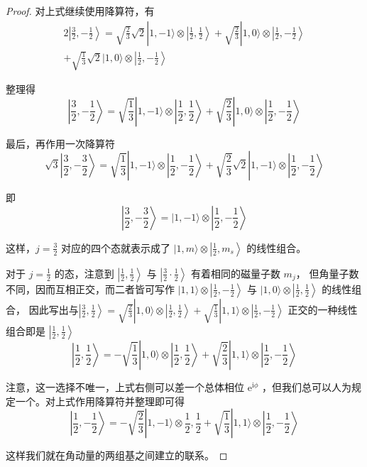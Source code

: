 \begin{proof}
对上式继续使用降算符，有
$$
\begin{gathered}
2\left|\frac{3}{2},-\frac{1}{2}\right\rangle=\sqrt{\frac{2}{3}} \sqrt{2}|1,-1\rangle \otimes\left|\frac{1}{2}, \frac{1}{2}\right\rangle+\sqrt{\frac{2}{3}}|1,0\rangle \otimes\left|\frac{1}{2},-\frac{1}{2}\right\rangle \\
+\sqrt{\frac{1}{3}} \sqrt{2}|1,0\rangle \otimes\left|\frac{1}{2},-\frac{1}{2}\right\rangle
\end{gathered}
$$

整理得
$$
\left|\frac{3}{2},-\frac{1}{2}\right\rangle=\sqrt{\frac{1}{3}}|1,-1\rangle \otimes\left|\frac{1}{2}, \frac{1}{2}\right\rangle+\sqrt{\frac{2}{3}}|1,0\rangle \otimes\left|\frac{1}{2},-\frac{1}{2}\right\rangle
$$

最后，再作用一次降算符
$$
\sqrt{3}\left|\frac{3}{2},-\frac{3}{2}\right\rangle=\sqrt{\frac{1}{3}}|1,-1\rangle \otimes\left|\frac{1}{2},-\frac{1}{2}\right\rangle+\sqrt{\frac{2}{3}} \sqrt{2}|1,-1\rangle \otimes\left|\frac{1}{2},-\frac{1}{2}\right\rangle
$$

即
$$
\left|\frac{3}{2},-\frac{3}{2}\right\rangle=|1,-1\rangle \otimes\left|\frac{1}{2},-\frac{1}{2}\right\rangle
$$

这样，$j=\frac{3}{2}$ 对应的四个态就表示成了 $|1, m\rangle \otimes\left|\frac{1}{2}, m_{s}\right\rangle$ 的线性组合。

对于 $j=\frac{1}{2}$ 的态，注意到 $\left|\frac{1}{2}, \frac{1}{2}\right\rangle$ 与 $\left|\frac{3}{2} \cdot \frac{1}{2}\right\rangle$ 有着相同的磁量子数 $m_{j}$，
但角量子数不同，因而互相正交，而二者皆可写作 $|1,1\rangle \otimes\left|\frac{1}{2},-\frac{1}{2}\right\rangle$ 与 $|1,0\rangle \otimes\left|\frac{1}{2}, \frac{1}{2}\right\rangle$ 的线性组合，
因此写出与$\left|\frac{3}{2}, \frac{1}{2}\right\rangle=\sqrt{\frac{2}{3}}|1,0\rangle \otimes\left|\frac{1}{2}, \frac{1}{2}\right\rangle+\sqrt{\frac{1}{3}}|1,1\rangle \otimes\left|\frac{1}{2},-\frac{1}{2}\right\rangle$ 
正交的一种线性组合即是 $\left|\frac{1}{2}, \frac{1}{2}\right\rangle$
$$\left|\frac{1}{2}, \frac{1}{2}\right\rangle=-\sqrt{\frac{1}{3}}|1,0\rangle \otimes\left|\frac{1}{2}, \frac{1}{2}\right\rangle+\sqrt{\frac{2}{3}}|1,1\rangle \otimes\left|\frac{1}{2},-\frac{1}{2}\right\rangle$$

注意，这一选择不唯一，上式右侧可以差一个总体相位 $\mathrm{e}^{\mathrm{i} \phi}$ ，但我们总可以人为规定一个。对上式作用降算符并整理即可得
$$\left|\frac{1}{2},-\frac{1}{2}\right\rangle=-\sqrt{\frac{2}{3}}|1,-1\rangle \otimes \frac{1}{2}, \frac{1}{2}+\sqrt{\frac{1}{3}}|1,1\rangle \otimes\left|\frac{1}{2},-\frac{1}{2}\right\rangle$$

这样我们就在角动量的两组基之间建立的联系。
\end{proof}
